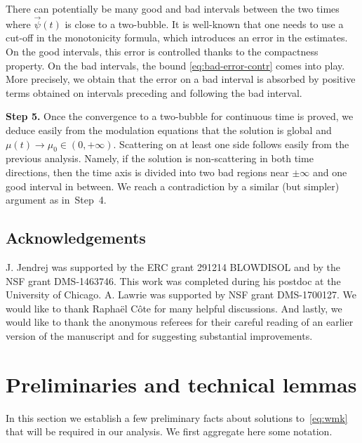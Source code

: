 \documentclass[10pt,reqno]{amsart}
\numberwithin{equation}{section}
\theoremstyle{remark}
\newcommand{\0}{\emptyset}
\begin{document}
There can potentially be many good and bad intervals between the two times where $\vec \psi(t)$ is close to a two-bubble. 
 It is well-known that one needs to use a cut-off in the monotonicity formula,
 which introduces an error in the estimates. On the good intervals, this error
 is controlled thanks to the compactness property. On the bad intervals,
 the bound \eqref{eq:bad-error-contr} comes into play. More precisely,
 we obtain that the error on a bad interval is absorbed by positive terms
 obtained on intervals preceding and following the bad interval.
 
  
 
 \noindent
 \textbf{Step 5.}
 Once the convergence to a two-bubble for continuous time is proved,
 we deduce easily from the modulation equations that the solution is global and $\mu(t) \to \mu_0 \in (0, +\infty)$.
 Scattering on at least one side follows easily from the previous analysis.
 Namely, if the solution is non-scattering in both time directions,
 then the time axis is divided into two bad regions near $\pm \infty$ and one good interval
 in between. We reach a contradiction by a similar (but simpler) argument as in~Step~4.
 

 \subsection{Acknowledgements}
J. Jendrej was supported by the ERC grant 291214 BLOWDISOL and by the NSF grant DMS-1463746.
This work was completed during his postdoc at the University of Chicago.
A. Lawrie was supported by NSF grant DMS-1700127. We would like to thank Rapha\"el C\^ote for many helpful discussions. And lastly, we would like to thank the anonymous referees for their careful reading of an earlier version of the manuscript and for suggesting substantial improvements. 
 
 
 \section{Preliminaries and technical lemmas} 
 
 
 In this section we establish a few preliminary facts about solutions to~\eqref{eq:wmk} that will be required in our analysis. We first aggregate here some notation. 
 
\end{document}
